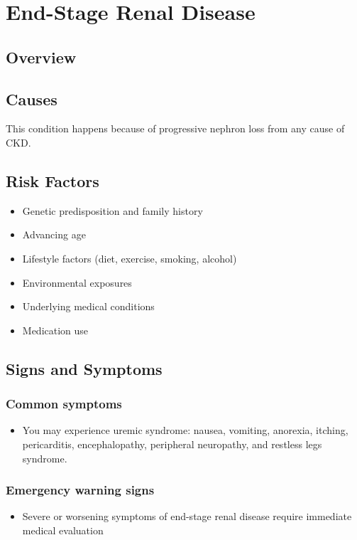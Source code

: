\chapter{End-Stage Renal Disease}
\label{sec:End-Stage Renal Disease}

\section{Overview}

\section{Causes}
This condition happens because of progressive nephron loss from any cause of CKD.     
\section{Risk Factors}

\begin{itemize}[noitemsep]
  \item Genetic predisposition and family history
  \item Advancing age
  \item Lifestyle factors (diet, exercise, smoking, alcohol)
  \item Environmental exposures
  \item Underlying medical conditions
  \item Medication use
\end{itemize}
\section{Signs and Symptoms}

\subsection{Common symptoms}
\begin{itemize}[noitemsep]
  \item You may experience uremic syndrome: nausea, vomiting, anorexia, itching, pericarditis, encephalopathy, peripheral neuropathy, and restless legs syndrome. 
  \end{itemize}

\subsection{Emergency warning signs}
\begin{itemize}[noitemsep]
  \item Severe or worsening symptoms of end-stage renal disease require immediate medical evaluation
\end{itemize}
